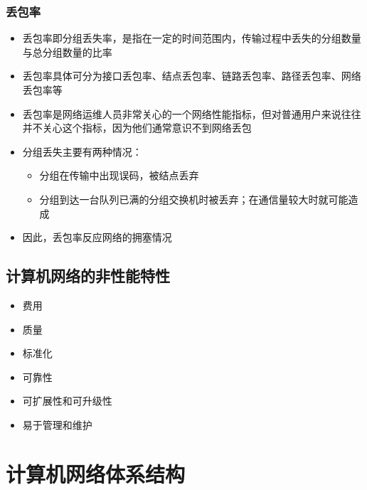 \documentclass[cs4size,a4paper,10pt]{ctexart}
\begin{document}
	\subsubsection{丢包率}
	\begin{itemize}
		\item 丢包率即分组丢失率，是指在一定的时间范围内，传输过程中丢失的分组数量与总分组数量的比率
		\item 丢包率具体可分为接口丢包率、结点丢包率、链路丢包率、路径丢包率、网络丢包率等
		\item 丢包率是网络运维人员非常关心的一个网络性能指标，但对普通用户来说往往并不关心这个指标，因为他们通常意识不到网络丢包
		\item 分组丢失主要有两种情况：
		\begin{itemize}
			\item 分组在传输中出现误码，被结点丢弃
			\item 分组到达一台队列已满的分组交换机时被丢弃；在通信量较大时就可能造成
		\end{itemize}
		\item 因此，丢包率反应网络的拥塞情况
	\end{itemize}


	\subsection{计算机网络的非性能特性}
	\begin{multicols}{2}
		\begin{itemize}
			\item 费用
			\item 质量
			\item 标准化
			\item 可靠性
			\item 可扩展性和可升级性
			\item 易于管理和维护
	\end{itemize}
	\end{multicols}

	\section{计算机网络体系结构}
\end{document}
